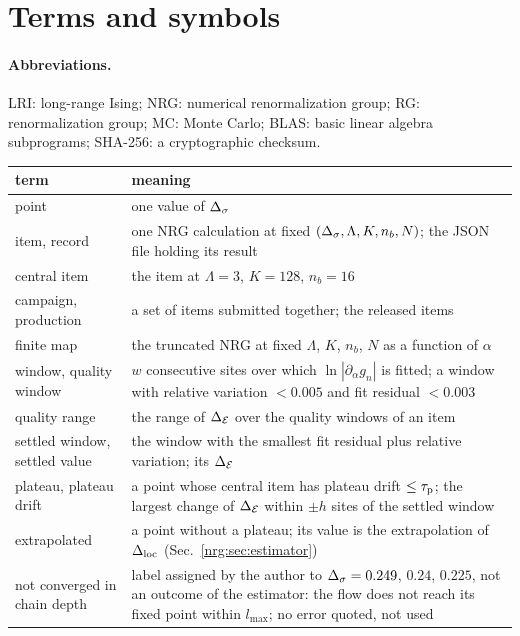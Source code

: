 \section{Terms and symbols}\label{nrg:app:symbols}
\paragraph{Abbreviations.} LRI: long-range Ising; NRG: numerical renormalization group; RG: renormalization group; MC: Monte Carlo;
BLAS: basic linear algebra subprograms; SHA-256: a cryptographic checksum.

\begin{longtable}{@{}>{\raggedright\arraybackslash}p{3.4cm}p{12.2cm}@{}}\toprule
term & meaning\\\midrule\endhead
point & one value of $\Delta_\sigma$\\
item, record & one NRG calculation at fixed $(\Delta_\sigma,\Lambda,K,n_b,N)$; the JSON file holding its result\\
central item & the item at $\Lambda=3$, $K=128$, $n_b=16$\\
campaign, production & a set of items submitted together; the released items\\
finite map & the truncated NRG at fixed $\Lambda$, $K$, $n_b$, $N$ as a function of $\alpha$\\
window, quality window & $w$ consecutive sites over which $\ln|\partial_\alpha g_n|$ is fitted; a window with relative variation $<0.005$ and fit residual $<0.003$\\
quality range & the range of $\Delta_{\mathcal E}$ over the quality windows of an item\\
settled window, settled value & the window with the smallest fit residual plus relative variation; its $\Delta_{\mathcal E}$\\
plateau, plateau drift & a point whose central item has plateau drift $\le\tau_{\rm p}$; the largest change of $\Delta_{\mathcal E}$ within $\pm h$ sites of the settled window\\
extrapolated & a point without a plateau; its value is the extrapolation of $\Delta_{\rm loc}$ (Sec.~\ref{nrg:sec:estimator})\\
not converged in chain depth & label assigned by the author to $\Delta_\sigma=0.249$, $0.24$, $0.225$, not an outcome of the estimator: the flow does not reach its fixed point within $l_{\max}$; no error quoted, not used\\

\end{longtable}
